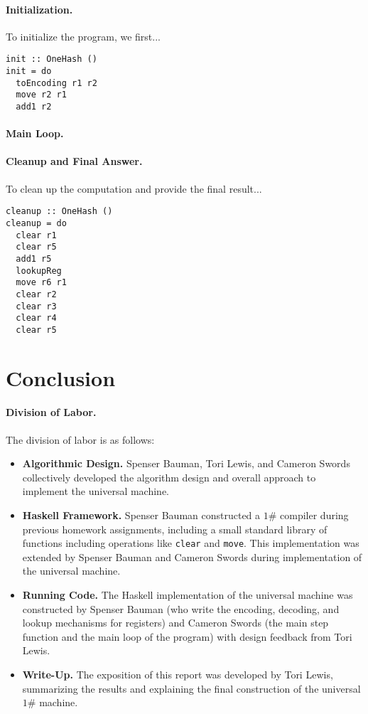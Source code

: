 \documentclass[10pt, preprint, nocopyrightspace]{sigplanconf}
\newcommand{\oh}{$1\#$\xspace}
\begin{document}
\paragraph{Initialization.}

To initialize the program, we first...

\begin{lstlisting}
init :: OneHash ()
init = do
  toEncoding r1 r2
  move r2 r1
  add1 r2
\end{lstlisting}

\paragraph{Main Loop.}

\paragraph{Cleanup and Final Answer.}

To clean up the computation and provide the final result...

\begin{lstlisting}
cleanup :: OneHash ()
cleanup = do
  clear r1
  clear r5
  add1 r5
  lookupReg
  move r6 r1
  clear r2
  clear r3
  clear r4
  clear r5
\end{lstlisting}

\section{Conclusion}

\paragraph{Division of Labor.} The division of labor is as follows:
\begin{itemize}
\item \textbf{Algorithmic Design.} 
      Spenser Bauman, Tori Lewis, and Cameron Swords collectively developed the
      algorithm design and overall approach to implement the universal machine.
\item \textbf{Haskell Framework.}
      Spenser Bauman constructed a \oh compiler during previous homework
      assignments, including a small standard library of functions including
      operations like \lstinline{clear} and \lstinline{move}. This
      implementation was extended by Spenser Bauman and Cameron Swords during
      implementation of the universal machine.
\item \textbf{Running Code.} 
      The Haskell implementation of the universal machine was constructed by
      Spenser Bauman (who write the encoding, decoding, and lookup mechanisms
      for registers) and Cameron Swords (the main step function and the main
      loop of the program) with design feedback from Tori Lewis.
\item \textbf{Write-Up.}
      The exposition of this report was developed by Tori Lewis, summarizing the
      results and explaining the final construction of the universal \oh
      machine. 
\end{itemize}
\end{document}

